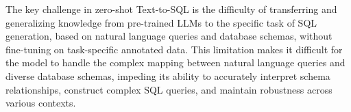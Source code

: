 The key challenge in zero-shot Text-to-SQL is the difficulty of transferring and generalizing knowledge from pre-trained LLMs to the specific task of SQL generation, based on natural language queries and database schemas, without fine-tuning on task-specific annotated data. 
This limitation makes it difficult for the model to handle the complex mapping between natural language queries and diverse database schemas, impeding its ability to accurately interpret schema relationships, construct complex SQL queries, and maintain robustness across various contexts.










% 
% 

